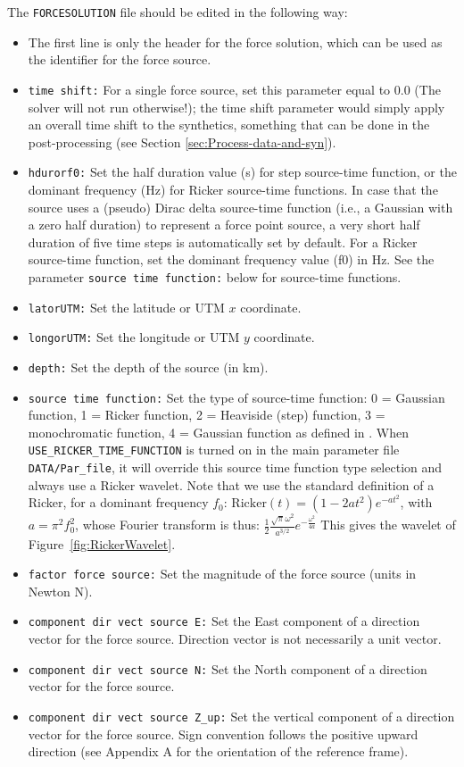 \noindent The \texttt{FORCESOLUTION} file should be edited in the
following way:
\begin{itemize}
\item The first line is only the header for the force solution, which can
be used as the identifier for the force source.
\item \texttt{time shift:} For a single force source, set
this  parameter equal to $0.0$ (The solver will not run otherwise!); the time
shift parameter would simply apply an overall time shift to the synthetics,
something that can be done in the post-processing (see Section \ref{sec:Process-data-and-syn}).
\item \texttt{hdurorf0:} Set the half duration value (s) for step source-time
function, or the dominant frequency (Hz) for Ricker source-time functions.
In case that the source uses a (pseudo) Dirac delta source-time function (i.e., a Gaussian with a zero half duration) to represent
a force point source, a very short half duration of five time steps is automatically set by default.
For a Ricker source-time function, set the dominant frequency value (f0) in Hz.
See the parameter \texttt{source time function:} below for source-time functions.
\item \texttt{latorUTM:} Set the latitude or UTM $x$ coordinate.
\item \texttt{longorUTM:} Set the longitude or UTM $y$ coordinate.
\item \texttt{depth:} Set the depth of the source (in km).
\item \texttt{source time function:} Set the type of source-time function: 0 = Gaussian function, 1 = Ricker function, 2 = Heaviside (step) function, 3 = monochromatic function, 4 = Gaussian function as defined in \citet{Meschede2011}.
When {\texttt{USE\_RICKER\_TIME\_FUNCTION}} is turned on in the main parameter file \texttt{DATA/Par\_file},
it will override this source time function type selection and always use a Ricker wavelet.
Note that we use the standard definition of a Ricker, for a dominant frequency $f_0$:
$\mathrm{Ricker}(t) = (1 - 2 a t^2) e^{-a t^2}$, with $a = \pi^2 f_0^2$,
whose Fourier transform is thus:
$\frac{1}{2} \frac{\sqrt{\pi}\omega^2}{a^{3/2}}e^{-\frac{\omega^2}{4 a}}$
This gives the wavelet of Figure~\ref{fig:RickerWavelet}.
\item \texttt{factor force source:} Set the magnitude of the force source (units in Newton N).
\item \texttt{component dir vect source E:} Set the East component of a direction vector for the force
source. Direction vector is not necessarily a unit vector.
\item \texttt{component dir vect source N:} Set the North component of a direction vector for the force
source.
\item \texttt{component dir vect source Z\_up:} Set the vertical component of a direction vector for the force
source. Sign convention follows the positive upward direction (see Appendix A for the orientation
of the reference frame).
\end{itemize}
